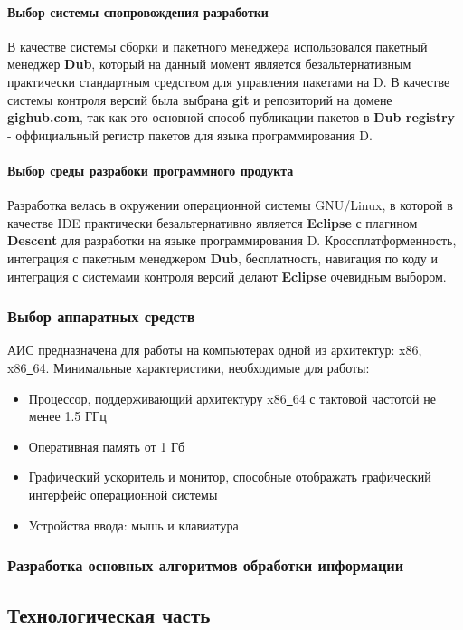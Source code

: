 \documentclass[russian,utf8,emptystyle]{eskdtext}
\begin{document}
\paragraph{Выбор системы спопровождения разработки}
В качестве системы сборки и пакетного менеджера использовался пакетный менеджер \textbf{Dub}, который на данный момент является безальтернативным практически стандартным средством для управления пакетами на D. В качестве системы контроля версий была выбрана \textbf{git} и репозиторий на домене \textbf{gighub.com}, так как это основной способ публикации пакетов в \textbf{Dub registry} - оффициальный регистр пакетов для языка программирования D.

\paragraph{Выбор среды разрабоки программного продукта}
Разработка велась в окружении операционной системы GNU/Linux, в которой в качестве IDE практически безальтернативно является \textbf{Eclipse} с плагином \textbf{Descent} для разработки на языке программирования D. Кроссплатформенность, интеграция с пакетным менеджером \textbf{Dub}, бесплатность, навигация по коду и интеграция с системами контроля версий делают \textbf{Eclipse} очевидным выбором. 

\subsubsection{Выбор аппаратных средств}
АИС предназначена для работы на компьютерах одной из архитектур: x86, x86\underline{~}64. Минимальные характеристики, необходимые для работы:
\begin{itemize}
\item Процессор, поддерживающий архитектуру x86\underline{~}64 с тактовой частотой не менее 1.5 ГГц
\item Оперативная память от 1 Гб
\item Графический ускоритель и монитор, способные отображать графический интерфейс операционной системы
\item Устройства ввода: мышь и клавиатура
\end{itemize}

\subsubsection{Разработка основных алгоритмов обработки информации}

\newpage
\subsection{Технологическая часть}
\end{document}
